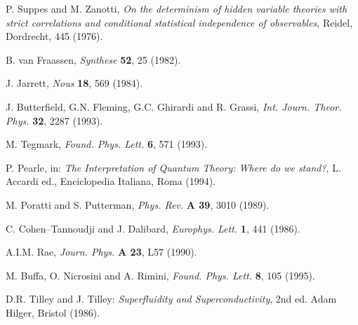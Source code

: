 \documentclass[12pt]{article}
\begin{document}
\begin{thebibliography}{999}
 P. Suppes and M. Zanotti, {\it On the determinism of
hidden variable theories with strict correlations and conditional
statistical independence of observables}, Reidel, Dordrecht, 445
(1976).

 B. van Fraassen, {\it Synthese} {\bf 52}, 25
(1982).

 J. Jarrett, {\it Nous} {\bf 18}, 569 (1984).

 J. Butterfield, G.N. Fleming, G.C. Ghirardi and R.
Grassi, {\it Int. Journ. Theor. Phys.} {\bf 32}, 2287 (1993).

 M. Tegmark, {\it Found. Phys. Lett.} {\bf 6}, 571
(1993).

 P. Pearle, in: {\it The Interpretation of Quantum
Theory: Where do we stand?}, L. Accardi ed., Enciclopedia
Italiana, Roma (1994).

 M. Poratti and S. Putterman, {\it Phys. Rev.} {\bf A
39}, 3010 (1989).

 C. Cohen--Tannoudji and J. Dalibard, {\it Europhys.
Lett.} {\bf 1}, 441 (1986).

 A.I.M. Rae, {\it Journ. Phys.} {\bf A 23}, L57
(1990).

 M. Buffa, O. Nicrosini and A. Rimini, {\it Found. Phys.
Lett.} {\bf 8}, 105 (1995).

 D.R. Tilley and J. Tilley: {\it Superfluidity and
Superconductivity}, 2nd ed. Adam Hilger, Bristol (1986).

\end{thebibliography}
\end{document}
